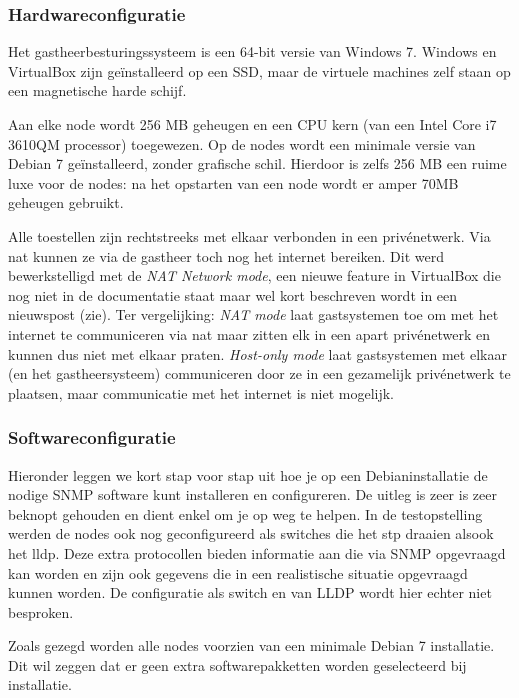 \subsubsection{Hardwareconfiguratie}

Het gastheerbesturingssysteem is een 64-bit versie van Windows 7.
Windows en VirtualBox zijn geïnstalleerd op een SSD, maar de virtuele machines zelf staan op een magnetische harde schijf.

Aan elke node wordt 256 MB geheugen en een CPU kern (van een Intel Core i7 3610QM processor) toegewezen.
Op de nodes wordt een minimale versie van Debian 7 geïnstalleerd, zonder grafische schil.
Hierdoor is zelfs 256 MB een ruime luxe voor de nodes: na het opstarten van een node wordt er amper 70MB geheugen gebruikt.

Alle toestellen zijn rechtstreeks met elkaar verbonden in een privénetwerk.
Via \gls{nat} kunnen ze via de gastheer toch nog het internet bereiken.
Dit werd bewerkstelligd met de \textit{NAT Network mode},
een nieuwe feature in VirtualBox die nog niet in de documentatie staat maar wel kort beschreven wordt in een nieuwspost (zie\cite{vbox-nat-network-mode}).
Ter vergelijking:
\textit{NAT mode} laat gastsystemen toe om met het internet te communiceren via \gls{nat} maar zitten elk in een apart privénetwerk en kunnen dus niet met elkaar praten.
\textit{Host-only mode} laat gastsystemen met elkaar (en het gastheersysteem) communiceren door ze in een gezamelijk privénetwerk te plaatsen, 
maar communicatie met het internet is niet mogelijk.

\subsubsection{Softwareconfiguratie}

Hieronder leggen we kort stap voor stap uit hoe je op een Debianinstallatie de nodige SNMP software kunt installeren en configureren.
De uitleg is zeer is zeer beknopt gehouden en dient enkel om je op weg te helpen.
In de testopstelling werden de nodes ook nog geconfigureerd als switches die het \gls{stp} draaien alsook het \gls{lldp}.
Deze extra protocollen bieden informatie aan die via SNMP opgevraagd kan worden en zijn ook gegevens die in een realistische situatie opgevraagd kunnen worden.
De configuratie als switch en van LLDP wordt hier echter niet besproken. 

Zoals gezegd worden alle nodes voorzien van een minimale Debian 7 installatie.
Dit wil zeggen dat er geen extra softwarepakketten worden geselecteerd bij installatie.


